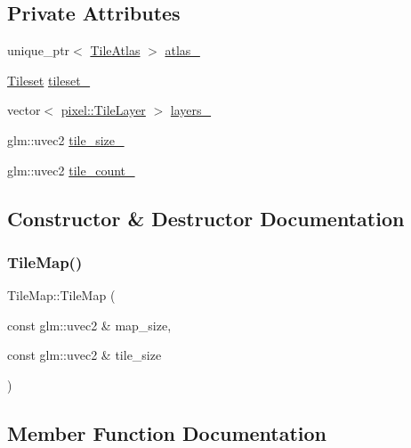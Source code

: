 \subsection*{Private Attributes}
\begin{DoxyCompactItemize}
\item 
unique\+\_\+ptr$<$ \hyperlink{classpixel_1_1_tile_atlas}{Tile\+Atlas} $>$ \hyperlink{classpixel_1_1_tile_map_a810ad0cdbfde0ed51e61c780360b193f}{atlas\+\_\+}
\item 
\hyperlink{classpixel_1_1_tileset}{Tileset} \hyperlink{classpixel_1_1_tile_map_a03c3fb17814bbbf8dc344870499e7b76}{tileset\+\_\+}
\item 
vector$<$ \hyperlink{classpixel_1_1_tile_layer}{pixel\+::\+Tile\+Layer} $>$ \hyperlink{classpixel_1_1_tile_map_af24b467f025449cae2612dad8e9c2e2a}{layers\+\_\+}
\item 
glm\+::uvec2 \hyperlink{classpixel_1_1_tile_map_a3a21dfe07a89fdba673af740e8da46dd}{tile\+\_\+size\+\_\+}
\item 
glm\+::uvec2 \hyperlink{classpixel_1_1_tile_map_a13b10cea1dd537a6bcb7577bc0ea15cc}{tile\+\_\+count\+\_\+}
\end{DoxyCompactItemize}


\subsection{Constructor \& Destructor Documentation}
\mbox{\label{classpixel_1_1_tile_map_adf716168df4051a1f80294951bd7f547}} 
\subsubsection{\texorpdfstring{Tile\+Map()}{TileMap()}}
{\footnotesize\ttfamily Tile\+Map\+::\+Tile\+Map (\begin{DoxyParamCaption}\item[{const glm\+::uvec2 \&}]{map\+\_\+size,  }\item[{const glm\+::uvec2 \&}]{tile\+\_\+size }\end{DoxyParamCaption})}



\subsection{Member Function Documentation}
\mbox{\label{classpixel_1_1_tile_map_a4e88b7241ae5372c0d5e8a102a8eb5e3}} 
